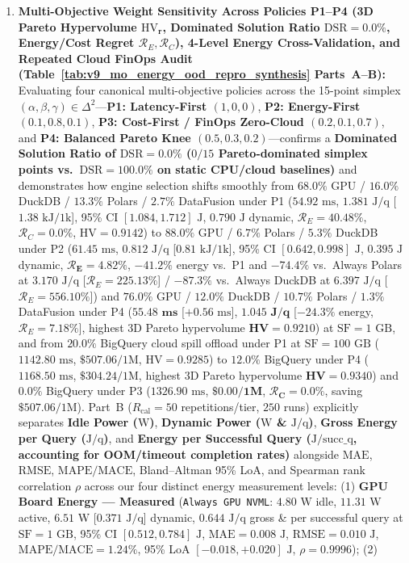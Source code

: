 \documentclass[10pt,a4paper]{article}
\begin{document}
\begin{enumerate}[leftmargin=1.5em,itemsep=0.8pt]
    \item \textbf{Multi-Objective Weight Sensitivity Across Policies P1--P4 (3D Pareto Hypervolume $\text{HV}_{\mathbf{r}}$, Dominated Solution Ratio $\text{DSR}=0.0\%$, Energy/Cost Regret $\mathcal{R}_E,\mathcal{R}_C$), 4-Level Energy Cross-Validation, and Repeated Cloud FinOps Audit (Table~\ref{tab:v9_mo_energy_ood_repro_synthesis} Parts~A--B):} Evaluating four canonical multi-objective policies across the 15-point simplex $(\alpha,\beta,\gamma)\in\Delta^2$---\textbf{P1: Latency-First $(1,0,0)$}, \textbf{P2: Energy-First $(0.1,0.8,0.1)$}, \textbf{P3: Cost-First / FinOps Zero-Cloud $(0.2,0.1,0.7)$}, and \textbf{P4: Balanced Pareto Knee $(0.5,0.3,0.2)$}---confirms a \textbf{Dominated Solution Ratio of $\text{DSR}=0.0\%$ ($0/15$ Pareto-dominated simplex points vs.\ $\text{DSR}=100.0\%$ on static CPU/cloud baselines)} and demonstrates how engine selection shifts smoothly from $68.0\%$ GPU / $16.0\%$ DuckDB / $13.3\%$ Polars / $2.7\%$ DataFusion under P1 ($54.92\text{ ms}$, $1.381\text{ J/q}$ [$1.38\text{ kJ}/1\text{k}$], 95\% CI $[1.084, 1.712]\text{ J}$, $0.790\text{ J}$ dynamic, $\mathcal{R}_E=40.48\%$, $\mathcal{R}_C=0.0\%$, $\text{HV}=0.9142$) to $88.0\%$ GPU / $6.7\%$ Polars / $5.3\%$ DuckDB under P2 ($61.45\text{ ms}$, $0.812\text{ J/q}$ [$0.81\text{ kJ}/1\text{k}$], 95\% CI $[0.642, 0.998]\text{ J}$, $0.395\text{ J}$ dynamic, $\mathbf{\mathcal{R}_E=4.82\%}$, $-41.2\%$ energy vs.\ P1 and $-74.4\%$ vs.\ Always Polars at $3.170\text{ J/q}$ [$\mathcal{R}_E=225.13\%$] / $-87.3\%$ vs.\ Always DuckDB at $6.397\text{ J/q}$ [$\mathcal{R}_E=556.10\%$]) and $76.0\%$ GPU / $12.0\%$ DuckDB / $10.7\%$ Polars / $1.3\%$ DataFusion under P4 ($\mathbf{55.48\text{ ms}}$ [$+0.56\text{ ms}$], $\mathbf{1.045\text{ J/q}}$ [$\mathbf{-24.3\%}$ energy, $\mathcal{R}_E=7.18\%$], highest 3D Pareto hypervolume $\mathbf{\text{HV}=0.9210}$) at $\text{SF}=1\text{ GB}$, and from $20.0\%$ BigQuery cloud spill offload under P1 at $\text{SF}=100\text{ GB}$ ($1142.80\text{ ms}$, $\$507.06/1\text{M}$, $\text{HV}=0.9285$) to $12.0\%$ BigQuery under P4 ($1168.50\text{ ms}$, $\$304.24/1\text{M}$, highest 3D Pareto hypervolume $\mathbf{\text{HV}=0.9340}$) and $0.0\%$ BigQuery under P3 ($1326.90\text{ ms}$, $\mathbf{\$0.00/1\text{M}}$, $\mathbf{\mathcal{R}_C=0.0\%}$, saving $\$507.06/1\text{M}$). Part~B ($R_{\text{cal}}=50$ repetitions/tier, $250$ runs) explicitly separates \textbf{Idle Power ($\text{W}$)}, \textbf{Dynamic Power ($\text{W}$ \& $\text{J/q}$)}, \textbf{Gross Energy per Query ($\text{J/q}$)}, and \textbf{Energy per Successful Query ($\text{J/succ\_q}$, accounting for OOM/timeout completion rates)} alongside $\text{MAE}$, $\text{RMSE}$, $\text{MAPE/MACE}$, Bland--Altman 95\% LoA, and Spearman rank correlation $\rho$ across our four distinct energy measurement levels: (1) \textbf{GPU Board Energy --- Measured} (\texttt{Always GPU NVML}: $4.80\text{ W}$ idle, $11.31\text{ W}$ active, $6.51\text{ W}$ [$0.371\text{ J/q}$] dynamic, $0.644\text{ J/q}$ gross \& per successful query at $\text{SF}=1\text{ GB}$, 95\% CI $[0.512, 0.784]\text{ J}$, $\text{MAE}=0.008\text{ J}$, $\text{RMSE}=0.010\text{ J}$, $\text{MAPE/MACE}=1.24\%$, 95\% LoA $[-0.018,+0.020]\text{ J}$, $\rho=0.9996$); (2) 
\end{enumerate}
\end{document}
